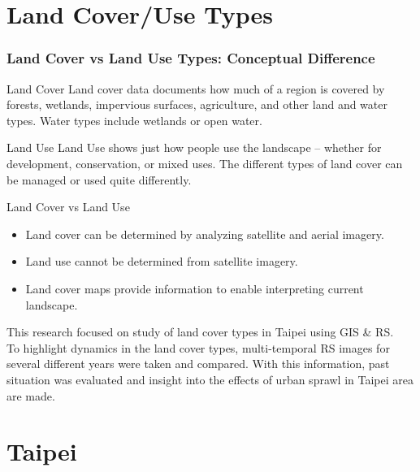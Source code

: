 \documentclass[pdflatex,compress,8pt,
	xcolor={dvipsnames,dvipsnames,svgnames,x11names,table},
	hyperref={	
	breaklinks = true, 
	pdfauthor={Lemenkova Polina}, 
	pdfsubject={Preentation}, 
	pdfcreator={Lemenkova Polina}, 
	pdfproducer={Lemenkova Polina}, 
	colorlinks=true,
	linkcolor=Gold1, 
	citecolor=NavyBlue, 
	urlcolor = NavyBlue, 
	breaklinks = true}]{beamer}
\begin{document}
\section{Land Cover/Use Types}
\begin{frame}\frametitle{Land Cover vs Land Use Types: Conceptual Difference}

\begin{alertblock}{Land Cover}
Land cover data documents how much of a region is covered by forests, wetlands, impervious surfaces, agriculture, and other land and water types. 
Water types include wetlands or open water.
\end{alertblock}

\begin{block}{Land Use}
Land Use shows just how people use the landscape – whether for development, conservation, or mixed uses. The different types of land cover can be managed or used quite differently.
\end{block}

\begin{examples}{Land Cover vs Land Use}
\begin{itemize}
	\item Land cover can be determined by analyzing satellite and aerial imagery.
	\item Land use cannot be determined from satellite imagery.
	\item Land cover maps provide information to enable interpreting current landscape.
\end{itemize}
\end{examples}

This research focused on study of land cover types in Taipei using GIS \& RS.\\
To highlight dynamics in the land cover types, multi-temporal RS images for several different years were taken and compared. 
With this information, past situation was evaluated and insight into the effects of urban sprawl in Taipei area are made.
\end{frame}

\section{Taipei}
\end{document}
